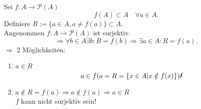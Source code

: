 \documentclass[../ana1.tex]{subfiles}
\begin{document}
\begin{bew}
	Sei \(f: A \rightarrow \mathcal{P}(A) \)
	\[ f(A) \subset A \quad \forall a \in A. \]
	Definiere \(R := \{a\in A, a \neq f(a)\} \subset A \).\\
	Angenommen \(f: A \rightarrow \mathcal{P}(A) \) ist surjektiv.
	\[ \Rightarrow \forall b\in A \exists b : B=f(b) \Rightarrow \exists a\in A : R = f(a). \]
	\(\Rightarrow \) 2 Möglichkeiten:
	\begin{enumerate}
		\item \(a\in R\) \[ a\in f(a = R = \{x\in A| x\notin f(x)\}) \text{\Lightning{}} \]
		\item \(a \notin R = f(a) \Rightarrow a \notin f(a) \Rightarrow a\in R \) \Lightning{}\\
		      \( f\) kann nicht surjektiv sein!
	\end{enumerate}
\end{bew}
\end{document}
